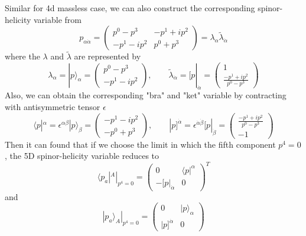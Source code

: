 \documentclass[12pt]{article}
\newcommand{\aket}[1]{|#1\rangle}
\newcommand{\sket}[1]{|#1]}
\newcommand{\abra}[1]{\langle #1|}
\newcommand{\sbra}[1]{[#1|}
\begin{document}
\hspace*{2em}Similar for 4d massless case, we can also construct the corresponding spinor-helicity variable from 
\begin{equation}
    p_{\alpha\dot{\alpha}}=\begin{pmatrix}
        p^0-p^3 & -p^1+ip^2 \\
        -p^1-ip^2 & p^0+p^3
    \end{pmatrix}=\lambda_\alpha \tilde{\lambda}_{\dot{\alpha}}
\end{equation}
where the $\lambda$ and $\tilde{\lambda}$ are represented by
\begin{equation}
    \lambda_{\alpha}=\aket{p}_{\alpha}=\begin{pmatrix}
        p^0-p^3\\
        -p^1-ip^2
    \end{pmatrix},\qquad \tilde{\lambda}_{\dot{\alpha}}=\sbra{p}_{\dot{\alpha}}=\begin{pmatrix}
        1\\
        \frac{-p^1+ip^2}{p^0-p^3}
    \end{pmatrix}
\end{equation}
Also, we can obtain the corresponding "bra" and "ket" variable by contracting with antisymmetric tensor $\epsilon$
\begin{equation}
    \abra{p}^\alpha=\epsilon^{\alpha\beta}\aket{p}_\beta=\begin{pmatrix}
        -p^1-ip^2\\
        -p^0+p^3
    \end{pmatrix},\qquad \sket{p}^{\dot{\alpha}}=\epsilon^{\dot{\alpha}\dot{\beta}}\sbra{p}_{\dot{\beta}}=\begin{pmatrix}
        \frac{-p^1+ip^2}{p^0-p^3}\\
        -1
    \end{pmatrix}
\end{equation}
Then it can found that if we choose the limit in which the fifth component $p^4=0$, the 5D spinor-helicity variable reduces to
\begin{equation}
    \abra{p_a}^A|_{p^4=0}=\begin{pmatrix}
        0 & \abra{p}^\alpha \\
        -\sbra{p}_{\dot{\alpha}} & 0
    \end{pmatrix}^T
\end{equation}
and 
\begin{equation}
    \aket{p_a}_A|_{p^4=0}=\begin{pmatrix}
        0 & \aket{p}_\alpha\\
        \sket{p}^{\dot{\alpha}} & 0
    \end{pmatrix}
\end{equation}
\end{document}
